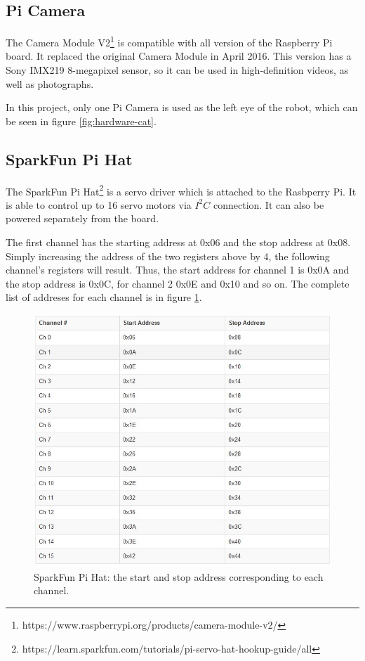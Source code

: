 \documentclass[runningheads,a4paper,12pt]{report}
\begin{document}
\subsection*{Pi Camera}
The Camera Module V2\footnote{https://www.raspberrypi.org/products/camera-module-v2/} is compatible with all version of the Raspberry Pi board. It replaced the original Camera Module in April 2016. This version has a Sony IMX219 8-megapixel sensor, so it can be used in high-definition videos, as well as photographs. 

In this project, only one Pi Camera is used as the left eye of the robot, which can be seen in figure \ref{fig:hardware-cat}.

\subsection*{SparkFun Pi Hat}
The SparkFun Pi Hat\footnote{https://learn.sparkfun.com/tutorials/pi-servo-hat-hookup-guide/all} is a servo driver which is attached to the Rasbperry Pi. It is able to control up to 16 servo motors via $I^2C$ connection. It can also be powered separately from the board.

The first channel has the starting address at 0x06 and the stop address at 0x08. Simply increasing the address of the two registers above by 4, the following channel's registers will result. Thus, the start address for channel 1 is 0x0A and the stop address is 0x0C, for channel 2 0x0E and 0x10 and so on. The complete list of addreses for each channel is in figure \ref{fig:hat-addresses}.

\begin{figure}
	\centering

  	\includegraphics[width=\linewidth]{./images/3_hat_addresses}\hfill

    \caption{SparkFun Pi Hat: the start and stop address corresponding to each channel.}  
    \label{fig:hat-addresses}
\end{figure}
\end{document}
